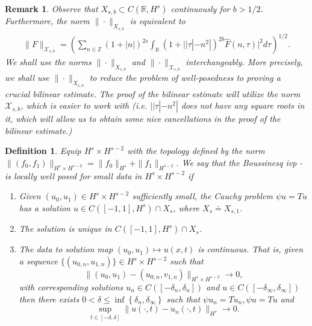 \documentclass[12pt,reqno]{amsart}
\numberwithin{equation}{section}  %
\renewcommand{\cref}{\Cref}
\newcommand{\rr}{\mathbb{R}}
\newcommand{\zz}{\mathbb{Z}}
\newcommand{\wh}{\widehat}
\newtheorem{definition}[theorem]{Definition}
\newtheorem{remark}[theorem]{Remark}
\begin{document}
%
\begin{remark}
  Observe that $X_{s,b} \subset C(\rr, H^{s})$ continuously for $b>1/2$. Furthermore, the norm $\| \cdot \|_{X_{s,b}}$ is equivalent to
  \begin{equation*}
  \begin{split}
    \| F \|_{\mathcal{X}_{s,b}}
    = \left( \sum_{n \in \zz} (1 + |n|)^{2s} \int_{\rr}
    (1 + ||\tau| - n^{2} |)^{2b} \wh{F}(n, \tau)|^{2} d \tau\right)^{1/2}.
  \end{split}
  \end{equation*}
  We shall use the norms $\| \cdot \|_{X_{s,b}}$ and $\| \cdot \|_{\mathcal{X}_{s,b}}$ interchangeably. More precisely, we shall use $\| \cdot \|_{X_{s,b}}$ to reduce the problem of well-posedness to proving a crucial bilinear estimate. The proof of the bilinear estimate will utilize the norm $\mathcal{X}_{s,b}$, which is easier to work with (i.e. $ | | \tau | - n^{2} |$ does not have any square roots in it, which will allow us to obtain some nice cancellations in the proof of the bilinear estimate.)   
\end{remark}
%
%
%
%
%
%
%
%
\begin{definition}
  Equip $H^{s} \times H^{s-2}$ with the 
  topology defined by the norm $\|(f_0, f_1)\|_{H^{s} \times H^{s-2}}
  = \|f_0\|_{H^{s}} + \|f_1\|_{H^{s-2}}$.
   We say that the Boussinesq ivp
  \cref{eqn:mb-2}-\cref{eqn:mb-init-data-2} is
	\emph{locally well posed} for small data in
  $H^s \times H^{s-2}$ if 
	\begin{enumerate}
    \item Given $(u_{0}, u_{1}) \in H^{s} \times H^{s-2}$
      sufficiently small, the Cauchy problem
      $\psi u = Tu$ has a solution $u \in C([-1,
      1], H^s) \cap X_{s}$, where $X_{s} \doteq X_{s,1}$. 
    \item The solution is unique in $C([-1, 1], H^{s}) \cap
      X_{s}$.
    \item
      The data to solution map $(u_0, u_{1}) \mapsto u(x,t)$ is continuous. That
      is, given a sequence $\{(u_{0,n}, u_{1,n} ) \} \in H^{s} \times H^{s-2}$
      such that $$\|(u_{0}, u_{1})
      - (u_{0,n}, v_{1,n}) \|_{H^{s} \times
      H^{s-2}} \to 0,$$ with corresponding solutions $u_{n} \in
      C([-\delta_{n},
      \delta_{n}])$ and $u \in C([-\delta_{\infty}, \delta_{\infty}])$
      then there exists $0 < \delta \le \inf\left\{
      \delta_{n}, \delta_{\infty} \right\}$ such that $\psi u_{n} =
      Tu_{n}, \psi u = Tu$ and 
      $$\sup_{t \in [-\delta, \delta]}
      \|u(\cdot, t) - u_{n}(\cdot, t) \|_{H^s} \to 0.$$
  \end{enumerate}
\end{definition}
%
\end{document}
